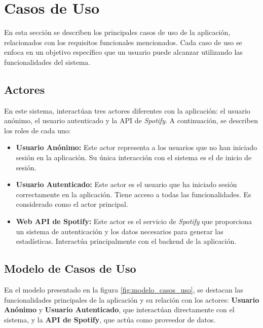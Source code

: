 \section{Casos de Uso}

En esta sección se describen los principales casos de uso de la aplicación, relacionados con los requisitos funcionales mencionados. Cada caso de uso se enfoca en un objetivo específico que un usuario puede alcanzar utilizando las funcionalidades del sistema.

\subsection{Actores}

En este sistema, interactúan tres actores diferentes con la aplicación: el usuario anónimo, el usuario autenticado y la API de \textit{Spotify}. A continuación, se describen los roles de cada uno:

\begin{itemize}
    \item \textbf{Usuario Anónimo:} Este actor representa a los usuarios que no han iniciado sesión en la aplicación. Su única interacción con el sistema es el de inicio de sesión.
    \item \textbf{Usuario Autenticado:} Este actor es el usuario que ha iniciado sesión correctamente en la aplicación. Tiene acceso a todas las funcionalidades. Es considerado como el actor principal.
    \item \textbf{Web API de Spotify:} Este actor es el servicio de \textit{Spotify} que proporciona un sistema de autenticación y los datos necesarios para generar las estadísticas. Interactúa principalmente con el backend de la aplicación.
\end{itemize}


\subsection{Modelo de Casos de Uso}

En el modelo presentado en la figura \ref{fig:modelo_casos_uso}, se destacan las funcionalidades principales de la aplicación y su relación con los actores: \textbf{Usuario Anónimo} y \textbf{Usuario Autenticado}, que interactúan directamente con el sistema, y la \textbf{API de Spotify}, que actúa como proveedor de datos.

